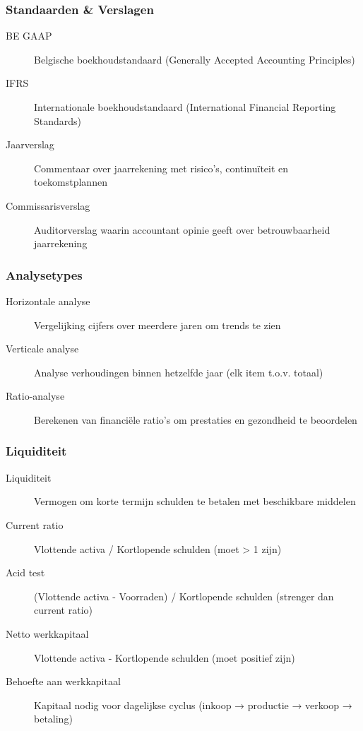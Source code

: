 \documentclass[a4paper,11pt]{article}
\begin{document}
\subsubsection{Standaarden \& Verslagen}
\begin{description}
    \item[BE GAAP] Belgische boekhoudstandaard (Generally Accepted Accounting Principles)
    \item[IFRS] Internationale boekhoudstandaard (International Financial Reporting Standards)
    \item[Jaarverslag] Commentaar over jaarrekening met risico's, continuïteit en toekomstplannen
    \item[Commissarisverslag] Auditorverslag waarin accountant opinie geeft over betrouwbaarheid jaarrekening
\end{description}

\subsubsection{Analysetypes}
\begin{description}
    \item[Horizontale analyse] Vergelijking cijfers over meerdere jaren om trends te zien
    \item[Verticale analyse] Analyse verhoudingen binnen hetzelfde jaar (elk item t.o.v. totaal)
    \item[Ratio-analyse] Berekenen van financiële ratio's om prestaties en gezondheid te beoordelen
\end{description}

\subsubsection{Liquiditeit}
\begin{description}
    \item[Liquiditeit] Vermogen om korte termijn schulden te betalen met beschikbare middelen
    \item[Current ratio] Vlottende activa / Kortlopende schulden (moet > 1 zijn)
    \item[Acid test] (Vlottende activa - Voorraden) / Kortlopende schulden (strenger dan current ratio)
    \item[Netto werkkapitaal] Vlottende activa - Kortlopende schulden (moet positief zijn)
    \item[Behoefte aan werkkapitaal] Kapitaal nodig voor dagelijkse cyclus (inkoop → productie → verkoop → betaling)
\end{description}
\end{document}
